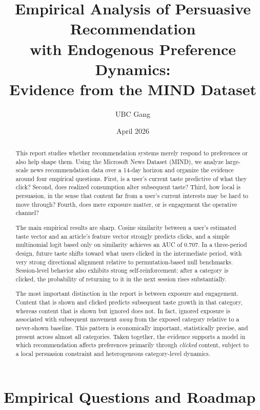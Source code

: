 \documentclass[11pt]{article}
\title{Empirical Analysis of Persuasive Recommendation\\with Endogenous Preference Dynamics:\\[4pt] Evidence from the MIND Dataset}
\author{UBC Gang}
\date{April 2026}
\begin{document}
\maketitle

\begin{abstract}
This report studies whether recommendation systems merely respond to preferences or also help shape them. Using the Microsoft News Dataset (MIND), we analyze large-scale news recommendation data over a 14-day horizon and organize the evidence around four empirical questions. First, is a user's current taste predictive of what they click? Second, does realized consumption alter subsequent taste? Third, how local is persuasion, in the sense that content far from a user's current interests may be hard to move through? Fourth, does mere exposure matter, or is engagement the operative channel?

The main empirical results are sharp. Cosine similarity between a user's estimated taste vector and an article's feature vector strongly predicts clicks, and a simple multinomial logit based only on similarity achieves an AUC of 0.707. In a three-period design, future taste shifts toward what users clicked in the intermediate period, with very strong directional alignment relative to permutation-based null benchmarks. Session-level behavior also exhibits strong self-reinforcement: after a category is clicked, the probability of returning to it in the next session rises substantially.

The most important distinction in the report is between exposure and engagement. Content that is shown and clicked predicts subsequent taste growth in that category, whereas content that is shown but ignored does not. In fact, ignored exposure is associated with subsequent movement \emph{away} from the exposed category relative to a never-shown baseline. This pattern is economically important, statistically precise, and present across almost all categories. Taken together, the evidence supports a model in which recommendation affects preferences primarily through \emph{clicked} content, subject to a local persuasion constraint and heterogeneous category-level dynamics.
\end{abstract}


\section{Empirical Questions and Roadmap}
\end{document}
